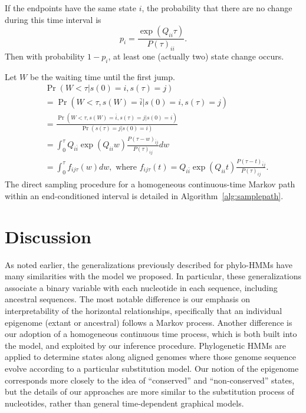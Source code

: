 \documentclass[11pt]{article}
\begin{document}
If the endpoints have the same state $i$, the probability that there
are no change during this time interval is
\begin{equation} \label{eqn:pnojump}
p_i = \frac{\exp(Q_{ii}\tau)}{P(\tau)_{ii}}.
\end{equation}
Then with probability $1-p_i$, at least one (actually two) state change occurs.

Let $W$ be the waiting time until the first jump.
\begin{equation}
\begin{aligned}
& \Pr(W < \tau | s(0) = i, s(\tau) = j)  \\
& =  \Pr(W < \tau, s(W) = \bar{i} | s(0) = i, s(\tau) = j)\\
& = \frac{\Pr(W < \tau, s(W) = \bar{i},s(\tau) = j | s(0) = i) } {\Pr(s(\tau) = j | s(0) = i)}  \\
& = \int_{0}^{\tau} Q_{i\bar{i}} \exp(Q_{ii}w) \frac{P(\tau-w)_{\bar{i}j}}{P(\tau)_{ij}} dw \\
& = \int_{0}^{\tau} f_{ij\tau}(w) dw, \text{~where~}
f_{ij\tau}(t) = Q_{i\bar{i}} \exp(Q_{ii}t) \frac{P(\tau-t)_{\bar{i}j}}{P(\tau)_{ij}}.
\end{aligned}
\end{equation}
The direct sampling procedure for a homogeneous continuous-time Markov path within an end-conditioned interval is detailed in Algorithm~\ref{alg:samplepath}.

\section{Discussion}

As noted earlier, the generalizations previously described for
phylo-HMMs have many similarities with the model we proposed. In
particular, these generalizations associate a binary variable with
each nucleotide in each sequence, including ancestral sequences.  The
most notable difference is our emphasis on interpretability of the
horizontal relationships, specifically that an individual epigenome
(extant or ancestral) follows a Markov process. Another difference is
our adoption of a homogeneous continuous time process, which is both
built into the model, and exploited by our inference
procedure. Phylogenetic HMMs are applied to determine states along
aligned genomes where those genome sequence evolve according to a
particular substitution model. Our notion of the epigenome corresponds
more closely to the idea of ``conserved'' and ``non-conserved''
states, but the details of our approaches are more similar to the
substitution process of nucleotides, rather than general
time-dependent graphical models.
\end{document}
